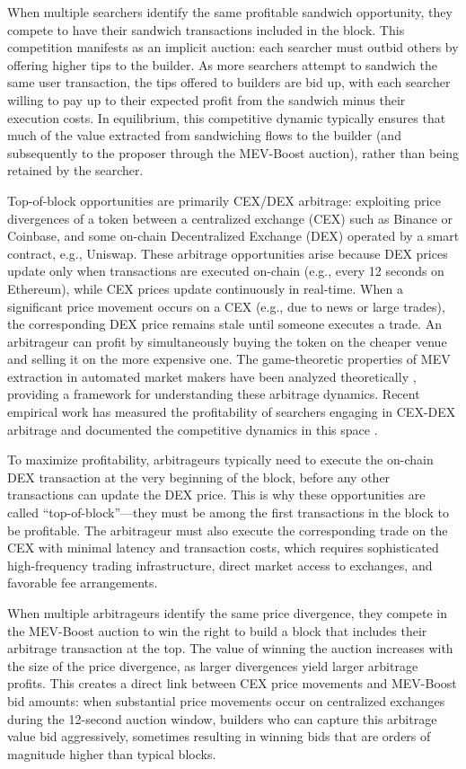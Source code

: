 \documentclass[12pt,reqno]{amsart}
\begin{document}
When multiple searchers identify the same profitable sandwich opportunity, they compete to have their sandwich transactions included in the block. This competition manifests as an implicit auction: each searcher must outbid others by offering higher tips to the builder. As more searchers attempt to sandwich the same user transaction, the tips offered to builders are bid up, with each searcher willing to pay up to their expected profit from the sandwich minus their execution costs. In equilibrium, this competitive dynamic typically ensures that much of the value extracted from sandwiching flows to the builder (and subsequently to the proposer through the MEV-Boost auction), rather than being retained by the searcher.

Top-of-block opportunities are primarily CEX/DEX arbitrage: exploiting price divergences of a token between a centralized exchange (CEX) such as Binance or Coinbase, and some on-chain Decentralized Exchange (DEX) operated by a smart contract, e.g., Uniswap. These arbitrage opportunities arise because DEX prices update only when transactions are executed on-chain (e.g., every 12 seconds on Ethereum), while CEX prices update continuously in real-time. When a significant price movement occurs on a CEX (e.g., due to news or large trades), the corresponding DEX price remains stale until someone executes a trade. An arbitrageur can profit by simultaneously buying the token on the cheaper venue and selling it on the more expensive one. The game-theoretic properties of MEV extraction in automated market makers have been analyzed theoretically \citep{kulkarni2022mevtheory}, providing a framework for understanding these arbitrage dynamics. Recent empirical work has measured the profitability of searchers engaging in CEX-DEX arbitrage and documented the competitive dynamics in this space \citep{wu2025darkest}.

To maximize profitability, arbitrageurs typically need to execute the on-chain DEX transaction at the very beginning of the block, before any other transactions can update the DEX price. This is why these opportunities are called ``top-of-block''---they must be among the first transactions in the block to be profitable. The arbitrageur must also execute the corresponding trade on the CEX with minimal latency and transaction costs, which requires sophisticated high-frequency trading infrastructure, direct market access to exchanges, and favorable fee arrangements.

When multiple arbitrageurs identify the same price divergence, they compete in the MEV-Boost auction to win the right to build a block that includes their arbitrage transaction at the top. The value of winning the auction increases with the size of the price divergence, as larger divergences yield larger arbitrage profits. This creates a direct link between CEX price movements and MEV-Boost bid amounts: when substantial price movements occur on centralized exchanges during the 12-second auction window, builders who can capture this arbitrage value bid aggressively, sometimes resulting in winning bids that are orders of magnitude higher than typical blocks. 
\end{document}
